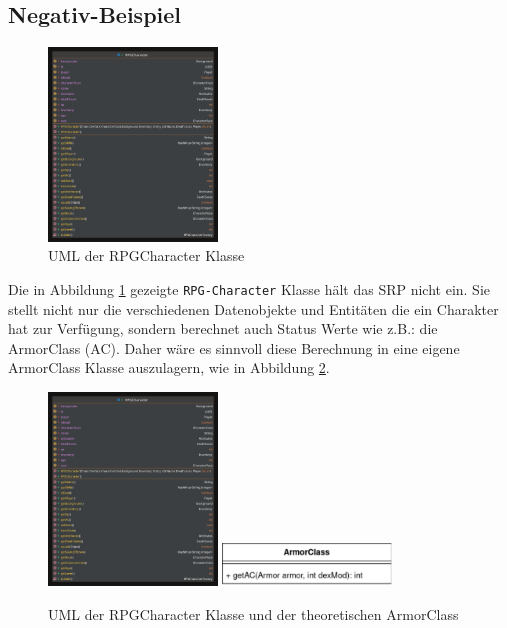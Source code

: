 \subsection{Negativ-Beispiel}
\begin{figure}[H]
	\centering
	\includegraphics[width=0.4\textwidth]{Bilder/RPGCharacter.pdf}
	\caption{UML der RPGCharacter Klasse}
	\label{fig:RPG-Charadter}
\end{figure}
Die in Abbildung \ref{fig:RPG-Charadter} gezeigte \texttt{RPG-Character} Klasse hält das SRP nicht ein. Sie stellt nicht nur die verschiedenen Datenobjekte und Entitäten die ein Charakter hat zur Verfügung, sondern berechnet auch Status Werte wie z.B.: die ArmorClass (AC).  Daher wäre es sinnvoll diese Berechnung in eine eigene ArmorClass Klasse auszulagern, wie in Abbildung \ref{fig:RPG-CharadterSRP}.
\begin{figure}[H]
	\centering
	\includegraphics[width=0.4\textwidth]{Bilder/RPGCharacter.pdf}
		\includegraphics[width=0.4\textwidth]{Bilder/RPGCharacterSRP.drawio.pdf}
	\caption{UML der RPGCharacter Klasse und der theoretischen ArmorClass}
	\label{fig:RPG-CharadterSRP}
\end{figure}

